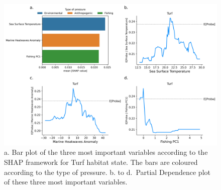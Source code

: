 \begin{figure}
\hypertarget{fig:chap3figS50}{%
\centering
\includegraphics{03-Chapitre3/figures/supplementary/04-pdp_Turf.png}
\caption{a. Bar plot of the three most important variables according to
the SHAP framework for Turf habitat state. The bars are coloured
according to the type of pressure. b. to d.~Partial Dependence plot of
these three most important variables.}\label{fig:chap3figS50}
}
\end{figure}


\let\sectionmark\oldsectionmark

\captionsetup[figure]{list=yes}
\captionsetup[table]{list=yes}

\renewcommand{\thefigure}{\arabic{figure}}
\renewcommand{\thetable}{\arabic{table}}   


